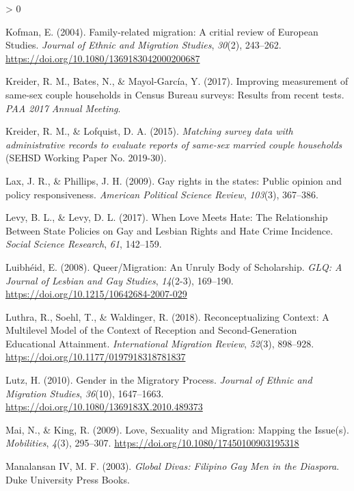 \documentclass[
  11pt,
]{article}
\newlength{\cslhangindent}
\newenvironment{CSLReferences}[2] %
 {%
  \setlength{\parindent}{0pt}
  \ifodd #1 \everypar{\setlength{\hangindent}{\cslhangindent}}\ignorespaces\fi
  \ifnum #2 > 0
  \setlength{\parskip}{#2\baselineskip}
  \fi
 }%
 {}
\begin{document}
\begin{CSLReferences}{1}{0}
\leavevmode\hypertarget{ref-kofman_2004_family}{}%
Kofman, E. (2004). Family-related migration: A critial review of {European Studies}. \emph{Journal of Ethnic and Migration Studies}, \emph{30}(2), 243--262. \url{https://doi.org/10.1080/1369183042000200687}

\leavevmode\hypertarget{ref-kreider_2017}{}%
Kreider, R. M., Bates, N., \& Mayol-García, Y. (2017). Improving measurement of same-sex couple households in {Census Bureau} surveys: {Results} from recent tests. \emph{{PAA} 2017 Annual Meeting}.

\leavevmode\hypertarget{ref-kreider_2015}{}%
Kreider, R. M., \& Lofquist, D. A. (2015). \emph{Matching survey data with administrative records to evaluate reports of same-sex married couple households} (SEHSD Working Paper No. 2019-30).

\leavevmode\hypertarget{ref-lax_2009}{}%
Lax, J. R., \& Phillips, J. H. (2009). Gay rights in the states: {Public} opinion and policy responsiveness. \emph{American Political Science Review}, \emph{103}(3), 367--386.

\leavevmode\hypertarget{ref-levy_2017}{}%
Levy, B. L., \& Levy, D. L. (2017). When {Love Meets Hate}: {The Relationship Between State Policies} on {Gay} and {Lesbian Rights} and {Hate Crime Incidence}. \emph{Social Science Research}, \emph{61}, 142--159.

\leavevmode\hypertarget{ref-luibheid_2008}{}%
Luibhéid, E. (2008). Queer/{Migration}: {An Unruly Body} of {Scholarship}. \emph{GLQ: A Journal of Lesbian and Gay Studies}, \emph{14}(2-3), 169--190. \url{https://doi.org/10.1215/10642684-2007-029}

\leavevmode\hypertarget{ref-luthra_2018}{}%
Luthra, R., Soehl, T., \& Waldinger, R. (2018). Reconceptualizing {Context}: {A Multilevel Model} of the {Context} of {Reception} and {Second}-{Generation Educational Attainment}. \emph{International Migration Review}, \emph{52}(3), 898--928. \url{https://doi.org/10.1177/0197918318781837}

\leavevmode\hypertarget{ref-lutz_2010}{}%
Lutz, H. (2010). Gender in the {Migratory Process}. \emph{Journal of Ethnic and Migration Studies}, \emph{36}(10), 1647--1663. \url{https://doi.org/10.1080/1369183X.2010.489373}

\leavevmode\hypertarget{ref-mai_2009}{}%
Mai, N., \& King, R. (2009). Love, {Sexuality} and {Migration}: {Mapping} the {Issue}(s). \emph{Mobilities}, \emph{4}(3), 295--307. \url{https://doi.org/10.1080/17450100903195318}

\leavevmode\hypertarget{ref-manalansaniv_2003}{}%
Manalansan IV, M. F. (2003). \emph{Global {Divas}: {Filipino Gay Men} in the {Diaspora}}. {Duke University Press Books}.


\end{CSLReferences}
\end{document}
